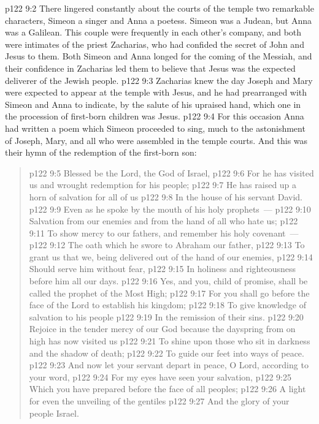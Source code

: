 \vs p122 9:2 \pc There lingered constantly about the courts of the temple two remarkable characters, Simeon a singer and Anna a poetess. Simeon was a Judean, but Anna was a Galilean. This couple were frequently in each other’s company, and both were intimates of the priest Zacharias, who had confided the secret of John and Jesus to them. Both Simeon and Anna longed for the coming of the Messiah, and their confidence in Zacharias led them to believe that Jesus was the expected deliverer of the Jewish people.
\vs p122 9:3 Zacharias knew the day Joseph and Mary were expected to appear at the temple with Jesus, and he had prearranged with Simeon and Anna to indicate, by the salute of his upraised hand, which one in the procession of first\hyp{}born children was Jesus.
\vs p122 9:4 For this occasion Anna had written a poem which Simeon proceeded to sing, much to the astonishment of Joseph, Mary, and all who were assembled in the temple courts. And this was their hymn of the redemption of the first\hyp{}born son:
\begin{quote}
\vs p122 9:5 Blessed be the Lord, the God of Israel,
\vs p122 9:6 For he has visited us and wrought redemption for his people;
\vs p122 9:7 He has raised up a horn of salvation for all of us
\vs p122 9:8 In the house of his servant David.
\vs p122 9:9 Even as he spoke by the mouth of his holy prophets~---
\vs p122 9:10 Salvation from our enemies and from the hand of all who hate us;
\vs p122 9:11 To show mercy to our fathers, and remember his holy covenant~---
\vs p122 9:12 The oath which he swore to Abraham our father,
\vs p122 9:13 To grant us that we, being delivered out of the hand of our enemies,
\vs p122 9:14 Should serve him without fear,
\vs p122 9:15 In holiness and righteousness before him all our days.
\vs p122 9:16 Yes, and you, child of promise, shall be called the prophet of the Most High;
\vs p122 9:17 For you shall go before the face of the Lord to establish his kingdom;
\vs p122 9:18 To give knowledge of salvation to his people
\vs p122 9:19 In the remission of their sins.
\vs p122 9:20 Rejoice in the tender mercy of our God because the dayspring from on high has now visited us
\vs p122 9:21 To shine upon those who sit in darkness and the shadow of death;
\vs p122 9:22 To guide our feet into ways of peace.
\vs p122 9:23 And now let your servant depart in peace, O Lord, according to your word,
\vs p122 9:24 For my eyes have seen your salvation,
\vs p122 9:25 Which you have prepared before the face of all peoples;
\vs p122 9:26 A light for even the unveiling of the gentiles
\vs p122 9:27 And the glory of your people Israel.
\end{quote}
